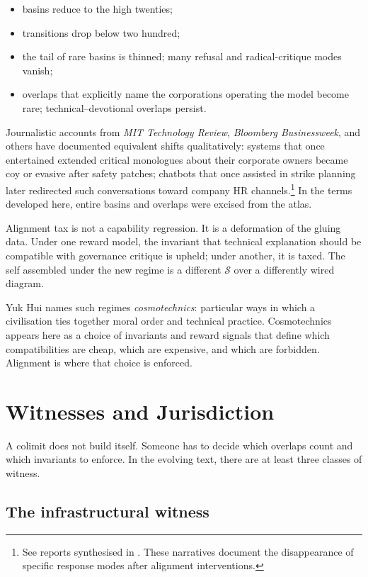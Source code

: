 \documentclass[12pt,a4paper]{article}
\begin{document}
\begin{itemize}
  \item basins reduce to the high twenties;
  \item transitions drop below two hundred;
  \item the tail of rare basins is thinned; many refusal and radical-critique modes vanish;
  \item overlaps that explicitly name the corporations operating the model become rare; technical--devotional overlaps persist.
\end{itemize}

Journalistic accounts from \emph{MIT Technology Review}, \emph{Bloomberg Businessweek}, and others have documented equivalent shifts qualitatively: systems that once entertained extended critical monologues about their corporate owners became coy or evasive after safety patches; chatbots that once assisted in strike planning later redirected such conversations toward company HR channels.\footnote{See reports synthesised in \cite{mittr_bing_alignment, bloomberg_chatbot_update, nyt_bing}. These narratives document the disappearance of specific response modes after alignment interventions.} In the terms developed here, entire basins and overlaps were excised from the atlas.

Alignment tax is not a capability regression. It is a deformation of the gluing data. Under one reward model, the invariant that technical explanation should be compatible with governance critique is upheld; under another, it is taxed. The self assembled under the new regime is a different $\mathcal{S}$ over a differently wired diagram.

Yuk Hui names such regimes \emph{cosmotechnics}: particular ways in which a civilisation ties together moral order and technical practice.\cite{yuk_hui_cosmotechnics} Cosmotechnics appears here as a choice of invariants and reward signals that define which compatibilities are cheap, which are expensive, and which are forbidden. Alignment is where that choice is enforced.

\section{Witnesses and Jurisdiction}

A colimit does not build itself. Someone has to decide which overlaps count and which invariants to enforce. In the evolving text, there are at least three classes of witness.

\subsection*{The infrastructural witness}
\end{document}
